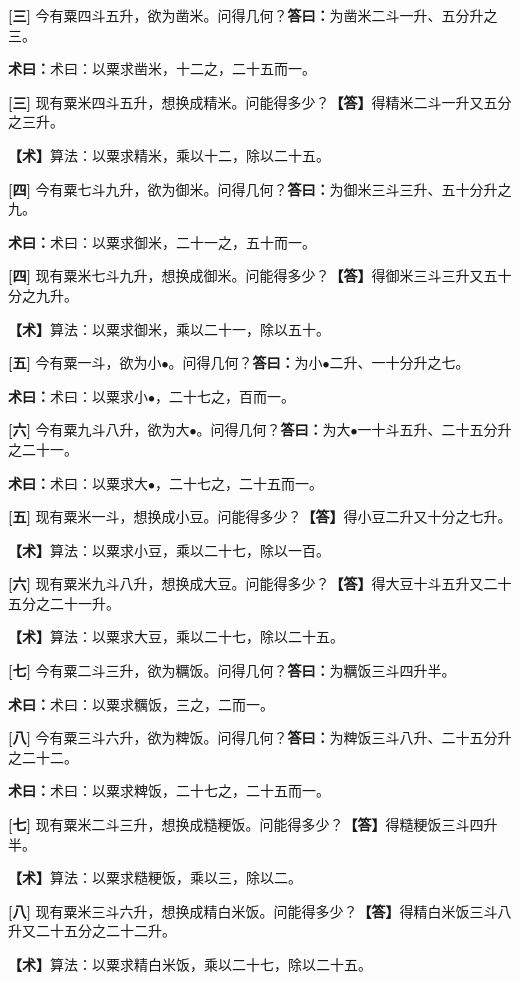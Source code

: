 \documentclass[10pt,a4paper]{article}
\newlength{\lw}
\newlength{\rw}
\newcommand{\bilingc}[2]{%
  \par\vspace{0.1em}%
  \noindent\begin{minipage}[t]{\lw}
  {\small #1}
  \end{minipage}%
  \hfill%
  \begin{minipage}[t]{\rw}
  {\small #2}
  \end{minipage}%
  \vspace{0.1em}%
}
\newcommand{\da}{\textbf{\textcolor{answercolor}{答曰：}}}
\newcommand{\daB}{\textbf{\textcolor{answercolor}{【答】}}}
\newcommand{\shu}{\textbf{\textcolor{methodcolor}{术曰：}}}
\newcommand{\shuB}{\textbf{\textcolor{methodcolor}{【术】}}}
\newcommand{\pn}[1]{\textbf{[#1]}}
\newcommand{\sk}{\vspace{0.1em}}
\begin{document}
\sk

\bilingc{
\pn{三} 今有粟四斗五升，欲为凿米。问得几何？\quad\da 为凿米二斗一升、五分升之三。

\shu 术曰：以粟求凿米，十二之，二十五而一。
}{
\pn{三} 现有粟米四斗五升，想换成精米。问能得多少？\quad\daB 得精米二斗一升又五分之三升。

\shuB 算法：以粟求精米，乘以十二，除以二十五。
}

\sk

\bilingc{
\pn{四} 今有粟七斗九升，欲为御米。问得几何？\quad\da 为御米三斗三升、五十分升之九。

\shu 术曰：以粟求御米，二十一之，五十而一。
}{
\pn{四} 现有粟米七斗九升，想换成御米。问能得多少？\quad\daB 得御米三斗三升又五十分之九升。

\shuB 算法：以粟求御米，乘以二十一，除以五十。
}

\vspace{0.3em}

\bilingc{
\pn{五} 今有粟一斗，欲为小$\bullet$。问得几何？\quad\da 为小$\bullet$二升、一十分升之七。

\shu 术曰：以粟求小$\bullet$，二十七之，百而一。

\pn{六} 今有粟九斗八升，欲为大$\bullet$。问得几何？\quad\da 为大$\bullet$一十斗五升、二十五分升之二十一。

\shu 术曰：以粟求大$\bullet$，二十七之，二十五而一。
}{
\pn{五} 现有粟米一斗，想换成小豆。问能得多少？\quad\daB 得小豆二升又十分之七升。

\shuB 算法：以粟求小豆，乘以二十七，除以一百。

\pn{六} 现有粟米九斗八升，想换成大豆。问能得多少？\quad\daB 得大豆十斗五升又二十五分之二十一升。

\shuB 算法：以粟求大豆，乘以二十七，除以二十五。
}

\vspace{0.3em}

\bilingc{
\pn{七} 今有粟二斗三升，欲为糲饭。问得几何？\quad\da 为糲饭三斗四升半。

\shu 术曰：以粟求糲饭，三之，二而一。

\pn{八} 今有粟三斗六升，欲为粺饭。问得几何？\quad\da 为粺饭三斗八升、二十五分升之二十二。

\shu 术曰：以粟求粺饭，二十七之，二十五而一。
}{
\pn{七} 现有粟米二斗三升，想换成糙粳饭。问能得多少？\quad\daB 得糙粳饭三斗四升半。

\shuB 算法：以粟求糙粳饭，乘以三，除以二。

\pn{八} 现有粟米三斗六升，想换成精白米饭。问能得多少？\quad\daB 得精白米饭三斗八升又二十五分之二十二升。

\shuB 算法：以粟求精白米饭，乘以二十七，除以二十五。
}
\end{document}
